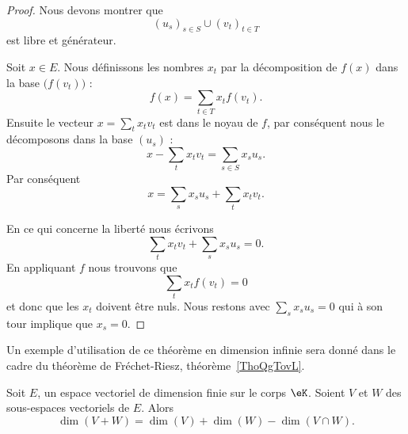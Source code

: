\begin{proof}
    Nous devons montrer que
    \begin{equation}
          (u_s)_{s\in S}\cup (v_t)_{t\in T}
    \end{equation}
    est libre et générateur.

    Soit \( x\in E\). Nous définissons les nombres \( x_t\) par la décomposition de \( f(x)\) dans la base \( \big( f(v_t) \big)\) :
    \begin{equation}
        f(x)=\sum_{t\in T}x_tf(v_t).
    \end{equation}
    Ensuite le vecteur \( x=\sum_tx_tv_t\) est dans le noyau de \( f\), par conséquent nous le décomposons dans la base \( (u_s)\) :
    \begin{equation}
        x-\sum_tx_tv_t=\sum_{s\in S} x_su_s.
    \end{equation}
    Par conséquent
    \begin{equation}
        x=\sum_sx_su_s+\sum_tx_tv_t.
    \end{equation}

    En ce qui concerne la liberté nous écrivons
    \begin{equation}
        \sum_tx_tv_t+\sum_sx_su_s=0.
    \end{equation}
    En appliquant \( f\) nous trouvons que
    \begin{equation}
        \sum_tx_tf(v_t)=0
    \end{equation}
    et donc que les \( x_t\) doivent être nuls. Nous restons avec \( \sum_sx_su_s=0\) qui à son tour implique que \( x_s=0\).
\end{proof}
Un exemple d'utilisation de ce théorème en dimension infinie sera donné dans le cadre du théorème de Fréchet-Riesz, théorème~\ref{ThoQgTovL}.

\begin{proposition}      \label{PROPooQCIXooHIyPPq}
    Soit \( E\), un espace vectoriel de dimension finie sur le corps $\eK$. Soient \( V\) et \( W\) des sous-espaces vectoriels de \( E\). Alors
    \begin{equation}
        \dim(V+W)=\dim(V)+\dim(W)-\dim(V\cap W).
    \end{equation}
\end{proposition}

